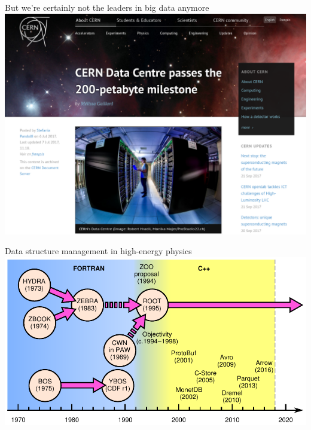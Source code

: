 \documentclass[aspectratio=169]{beamer}
\begin{document}
\begin{frame}{But we're certainly not the leaders in big data anymore}
\vspace{0.35 cm}
\includegraphics[width=0.73\linewidth]{cern-200pb.png}

\vspace{-4.8 cm}
\end{frame}

\begin{frame}{Data structure management in high-energy physics}
\vspace{0.25 cm}
\includegraphics[width=\linewidth]{history.pdf}
\end{frame}
\end{document}

